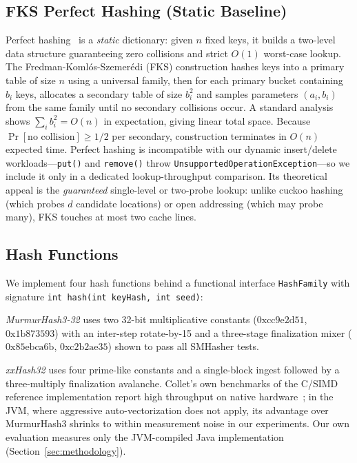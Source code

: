 \documentclass[10pt,journal,compsoc]{IEEEtran}
\begin{document}
\subsection{FKS Perfect Hashing (Static Baseline)}
Perfect hashing~\cite{fks1984perfect} is a \emph{static} dictionary: given $n$ fixed keys, it builds a two-level data structure guaranteeing zero collisions and strict $O(1)$ worst-case lookup. The Fredman-Kom\-l\'os-Szemer\'edi (FKS) construction hashes keys into a primary table of size $n$ using a universal family, then for each primary bucket containing $b_i$ keys, allocates a secondary table of size $b_i^2$ and samples parameters $(a_i, b_i)$ from the same family until no secondary collisions occur. A standard analysis shows $\sum_i b_i^2 = O(n)$ in expectation, giving linear total space. Because $\Pr[\text{no collision}] \geq 1/2$ per secondary, construction terminates in $O(n)$ expected time. Perfect hashing is incompatible with our dynamic insert/delete workloads---\texttt{put()} and \texttt{remove()} throw \texttt{UnsupportedOperationException}---so we include it only in a dedicated lookup-throughput comparison. Its theoretical appeal is the \emph{guaranteed} single-level or two-probe lookup: unlike cuckoo hashing (which probes $d$ candidate locations) or open addressing (which may probe many), FKS touches at most two cache lines.

\subsection{Hash Functions}
We implement four hash functions behind a functional interface \texttt{HashFamily} with signature \texttt{int hash(int keyHash, int seed)}:

\emph{MurmurHash3-32} uses two 32-bit multiplicative constants ($\text{0xcc9e2d51}$, $\text{0x1b873593}$) with an inter-step rotate-by-15 and a three-stage finalization mixer ($\text{0x85ebca6b}$, $\text{0xc2b2ae35}$) shown to pass all SMHasher tests.

\emph{xxHash32} uses four prime-like constants and a single-block ingest followed by a three-multiply finalization avalanche. Collet's own benchmarks of the C/SIMD reference implementation report high throughput on native hardware~\cite{collet2012xxhash}; in the JVM, where aggressive auto-vectorization does not apply, its advantage over MurmurHash3 shrinks to within measurement noise in our experiments. Our own evaluation measures only the JVM-compiled Java implementation (Section~\ref{sec:methodology}).
\end{document}

